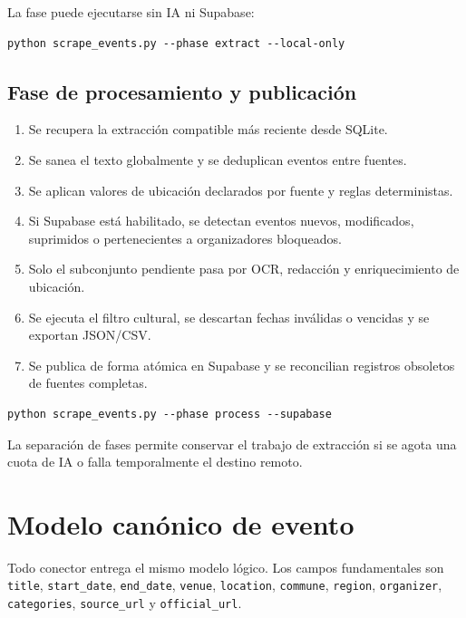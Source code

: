 \documentclass[11pt,a4paper]{article}
\begin{document}
La fase puede ejecutarse sin IA ni Supabase:

\begin{lstlisting}
python scrape_events.py --phase extract --local-only
\end{lstlisting}

\subsection{Fase de procesamiento y publicaci\'{o}n}

\begin{enumerate}
  \item Se recupera la extracci\'{o}n compatible m\'{a}s reciente desde SQLite.
  \item Se sanea el texto globalmente y se deduplican eventos entre fuentes.
  \item Se aplican valores de ubicaci\'{o}n declarados por fuente y reglas deterministas.
  \item Si Supabase est\'{a} habilitado, se detectan eventos nuevos, modificados, suprimidos o pertenecientes a organizadores bloqueados.
  \item Solo el subconjunto pendiente pasa por OCR, redacci\'{o}n y enriquecimiento de ubicaci\'{o}n.
  \item Se ejecuta el filtro cultural, se descartan fechas inv\'{a}lidas o vencidas y se exportan JSON/CSV.
  \item Se publica de forma at\'{o}mica en Supabase y se reconcilian registros obsoletos de fuentes completas.
\end{enumerate}

\begin{lstlisting}
python scrape_events.py --phase process --supabase
\end{lstlisting}

La separaci\'{o}n de fases permite conservar el trabajo de extracci\'{o}n si se agota una cuota de IA o falla temporalmente el destino remoto.

\section{Modelo can\'{o}nico de evento}

Todo conector entrega el mismo modelo l\'{o}gico. Los campos fundamentales son \texttt{title}, \texttt{start\_date}, \texttt{end\_date}, \texttt{venue}, \texttt{location}, \texttt{commune}, \texttt{region}, \texttt{organizer}, \texttt{categories}, \texttt{source\_url} y \texttt{official\_url}.
\end{document}

